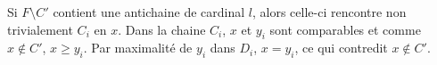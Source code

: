 \documentclass[a4paper,11pt]{exam}
\begin{document}
\begin{questions}
\begin{enumerate}[resume]
\begin{enumerate}
\begin{enumerate}
\begin{solution}
						Si $F \setminus C'$ contient une antichaine de cardinal $l$,
						alors celle-ci rencontre non trivialement $C_i$ en $x$.
						Dans la chaine $C_i$, $x$ et $y_i$ sont comparables et comme
						$x \not\in C'$, $x \geq y_i$.
						Par maximalité de $y_i$ dans $D_i$, $x=y_i$, ce qui contredit
						$x \not\in C'$.
					\end{solution}
				\end{enumerate}
			\end{enumerate}

\end{enumerate}
\end{questions}
\end{document}
